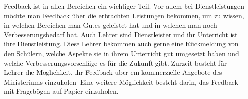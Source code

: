 Feedback ist in allen Bereichen ein wichtiger Teil. 
Vor allem bei Dienstleistungen möchte man Feedback über die erbrachten Leistungen bekommen, 
um zu wissen, in welchen Bereichen man Gutes geleistet hat und in welchen man noch Verbesserungsbedarf hat.
 Auch Lehrer sind Dienstleister und ihr Unterricht ist ihre Dienstleistung. 
 Diese Lehrer bekommen auch gerne eine Rückmeldung von den Schülern, 
 welche Aspekte sie in ihrem Unterricht gut umgesetzt haben und welche Verbesserungsvorschläge es für die Zukunft gibt.
\newline
\newline
Zurzeit besteht für Lehrer die Möglichkeit, ihr Feedback über ein 
kommerzielle Angebote des Ministeriums einzuholen. Eine weitere Möglichkeit 
besteht darin, das Feedback mit Fragebögen auf Papier einzuholen.
